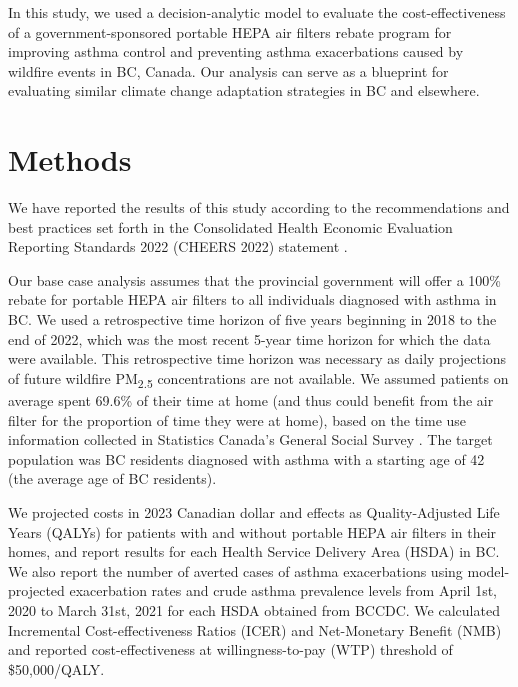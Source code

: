 \documentclass[
  number]{elsarticle}
\begin{document}
In this study, we used a decision-analytic model to evaluate the
cost-effectiveness of a government-sponsored portable HEPA air filters
rebate program for improving asthma control and preventing asthma
exacerbations caused by wildfire events in BC, Canada. Our analysis can
serve as a blueprint for evaluating similar climate change adaptation
strategies in BC and elsewhere.

\hypertarget{methods}{%
\section{Methods}\label{methods}}

We have reported the results of this study according to the
recommendations and best practices set forth in the Consolidated Health
Economic Evaluation Reporting Standards 2022 (CHEERS 2022) statement
\citep{husereau2022}.

Our base case analysis assumes that the provincial government will offer
a 100\% rebate for portable HEPA air filters to all individuals
diagnosed with asthma in BC. We used a retrospective time horizon of
five years beginning in 2018 to the end of 2022, which was the most
recent 5-year time horizon for which the data were available. This
retrospective time horizon was necessary as daily projections of future
wildfire PM\textsubscript{2.5} concentrations are not available. We
assumed patients on average spent 69.6\% of their time at home (and thus
could benefit from the air filter for the proportion of time they were
at home), based on the time use information collected in Statistics
Canada's General Social Survey
\citep{statisticscanadageneralsocialsurvey}. The target population was
BC residents diagnosed with asthma with a starting age of 42 (the
average age of BC residents)\citep{governmentofcanada2017}.

We projected costs in 2023 Canadian dollar and effects as
Quality-Adjusted Life Years (QALYs) for patients with and without
portable HEPA air filters in their homes, and report results for each
Health Service Delivery Area (HSDA) in BC. We also report the number of
averted cases of asthma exacerbations using model-projected exacerbation
rates and crude asthma prevalence levels from April 1st, 2020 to March
31st, 2021 for each HSDA obtained from
BCCDC\citep{britishcolumbiaministryofhealth}. We calculated Incremental
Cost-effectiveness Ratios (ICER) and Net-Monetary Benefit (NMB) and
reported cost-effectiveness at willingness-to-pay (WTP) threshold of
\$50,000/QALY.
\end{document}
